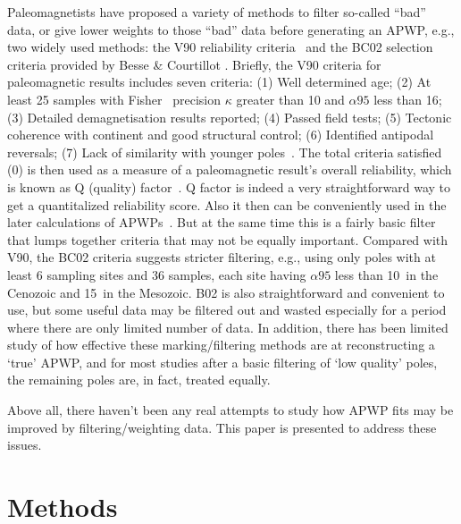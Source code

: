 Paleomagnetists have proposed a variety of methods to filter so-called ``bad''
data, or give lower weights to those ``bad'' data before generating an APWP,
e.g., two widely used methods: the V90 reliability criteria~\cite{v90} and the
BC02 selection criteria provided by Besse \& Courtillot .
Briefly, the V90 criteria for paleomagnetic results includes seven criteria: (1)
Well determined age; (2) At least 25 samples with Fisher~\cite{F53} precision
$\kappa$ greater than 10 and $\alpha95$ less than 16\degree; (3) Detailed
demagnetisation results reported; (4) Passed field tests; (5) Tectonic coherence
with continent and good structural control; (6) Identified antipodal reversals;
(7) Lack of similarity with younger poles~\cite{T92}. The total criteria
satisfied (0) is then used as a measure of a paleomagnetic result's
overall reliability, which is known as Q (quality) factor~\cite{T92}. Q factor
is indeed a very straightforward way to get a quantitalized reliability score.
Also it then can be conveniently used in the later calculations of
APWPs~\cite{T92}. But at the same time this is a fairly basic filter that lumps
together criteria that may not be equally important. Compared with V90, the BC02
criteria suggests stricter filtering, e.g., using only poles with at least 6
sampling sites and 36 samples, each site having $\alpha95$ less than 10\degree\
in the Cenozoic and 15\degree\ in the Mesozoic. B02 is also straightforward and
convenient to use, but some useful data may be filtered out and wasted
especially for a period where there are only limited number of data. In
addition, there has been limited study of how effective these marking/filtering
methods are at reconstructing a `true' APWP, and for most studies after a basic
filtering of `low quality' poles, the remaining poles are, in fact, treated
equally.

Above all, there haven't been any real attempts to study how APWP fits may be
improved by filtering/weighting data. This paper is presented to address these
issues.


\section{Methods}


